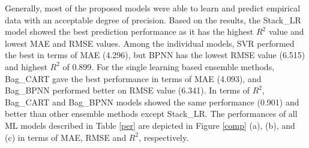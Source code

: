 \documentclass[11pt]{article}
\begin{document}
	
	Generally, most of the proposed models were able to learn and predict empirical data with an acceptable degree of precision. Based on the results, the Stack\_LR model showed the best prediction performance as it has the highest $R^2$ value and lowest MAE and RMSE values. Among the individual models, SVR performed the best in terms of MAE (4.296), but BPNN has the lowest RMSE value (6.515) and highest $R^2$ of 0.899. For the single learning based ensemble methods, Bag\_CART gave the best performance in terms of MAE (4.093), and Bag\_BPNN performed better on RMSE value (6.341). In terms of $R^2$, Bag\_CART and Bag\_BPNN models showed the same performance (0.901) and better than other ensemble methods except Stack\_LR. The performances of all ML models described in Table \ref{per} are depicted in Figure \ref{comp} (a), (b), and (c) in terms of MAE, RMSE and $R^2$, respectively.
	
	
	
\end{document}
